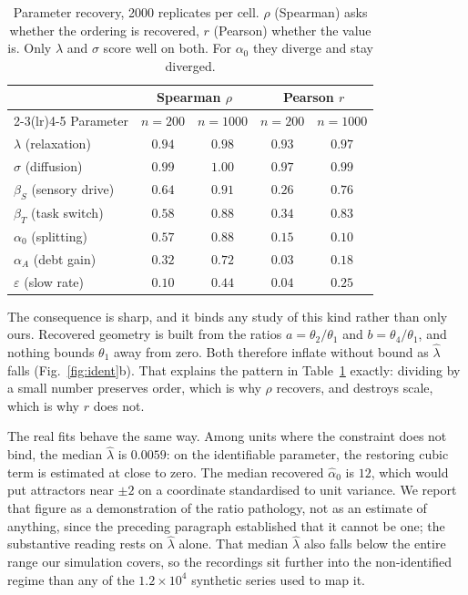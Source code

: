 \documentclass[conference]{IEEEtran}
\begin{document}
\begin{table}[tb]
\caption{Parameter recovery, 2000 replicates per cell. $\rho$ (Spearman) asks
whether the ordering is recovered, $r$ (Pearson) whether the value is. Only
$\lambda$ and $\sigma$ score well on both. For $\alpha_0$ they diverge and stay
diverged.}
\label{tab:ident}
\centering
\begin{tabular}{@{}lcccc@{}}
\toprule
& \multicolumn{2}{c}{Spearman $\rho$} & \multicolumn{2}{c}{Pearson $r$} \\
\cmidrule(lr){2-3}\cmidrule(lr){4-5}
Parameter & $n{=}200$ & $n{=}1000$ & $n{=}200$ & $n{=}1000$ \\
\midrule
$\lambda$ (relaxation)      & $\mathbf{0.94}$ & $\mathbf{0.98}$ & $\mathbf{0.93}$ & $\mathbf{0.97}$ \\
$\sigma$ (diffusion)        & $\mathbf{0.99}$ & $\mathbf{1.00}$ & $\mathbf{0.97}$ & $\mathbf{0.99}$ \\
$\beta_S$ (sensory drive)   & $0.64$ & $0.91$ & $0.26$ & $0.76$ \\
$\beta_T$ (task switch)     & $0.58$ & $0.88$ & $0.34$ & $0.83$ \\
$\alpha_0$ (splitting)      & $0.57$ & $0.88$ & $0.15$ & $0.10$ \\
$\alpha_A$ (debt gain)      & $0.32$ & $0.72$ & $0.03$ & $0.18$ \\
$\varepsilon$ (slow rate)   & $0.10$ & $0.44$ & $0.04$ & $0.25$ \\
\bottomrule
\end{tabular}
\end{table}

The consequence is sharp, and it binds any study of this kind rather than only
ours. Recovered geometry is built from the ratios $a=\theta_2/\theta_1$ and
$b=\theta_4/\theta_1$, and nothing bounds $\theta_1$ away from zero. Both
therefore inflate without bound as $\hat\lambda$ falls (Fig.~\ref{fig:ident}b).
That explains the pattern in Table~\ref{tab:ident} exactly: dividing by a small
number preserves order, which is why $\rho$ recovers, and destroys scale, which
is why $r$ does not.

The real fits behave the same way. Among units where the constraint does not
bind, the median $\hat\lambda$ is $0.0059$: on the identifiable parameter, the
restoring cubic term is estimated at close to zero. The median recovered
$\hat\alpha_0$ is $12$, which would put attractors near $\pm2$ on a coordinate
standardised to unit variance. We report that figure as a demonstration of the
ratio pathology, not as an estimate of anything, since the preceding paragraph
established that it cannot be one; the substantive reading rests on
$\hat\lambda$ alone. That median $\hat\lambda$ also falls below the entire
range our simulation covers, so the recordings sit further into the
non-identified regime than any of the $1.2\times10^{4}$ synthetic series used
to map it.
\end{document}
